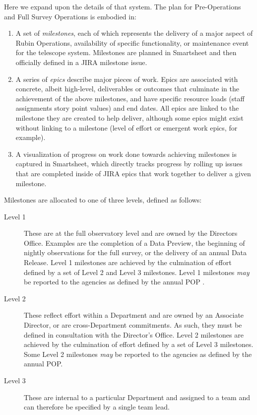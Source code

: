 Here we expand upon the details of that system.
The plan for Pre-Operations and Full Survey \gls{Operations} is embodied in:

\begin{enumerate}
    \item A set of \emph{milestones}, each of which represents the delivery of a major aspect of \gls{Rubin Operations}, availability of specific functionality, or maintenance event for the telescope system.
        Milestones are planned in Smartsheet and then officially defined in a \gls{JIRA} milestone issue.
    \item A series of \emph{epics} describe major pieces of work.
        Epics are associated with concrete, albeit high-level, deliverables or outcomes that culminate in the achievement of the above milestones, and have specific resource loads (staff assignments \gls{story} point values) and end dates.
        All epics are linked to the milestone they are created to help deliver, although some epics might exist without linking to a milestone (level of effort or emergent work epics, for example).
    \item A visualization of progress on work done towards achieving milestones is captured in Smartsheet, which directly tracks progress by rolling up issues that are completed inside of \gls{JIRA} epics that work together to deliver a given milestone.
\end{enumerate}

Milestones are allocated to one of three levels, defined as follows:

\begin{description}
\item[Level 1] These are at the full observatory level and are owned by the Directors Office.
Examples are the completion of a Data Preview, the beginning of nightly observations for the full survey, or the delivery of an annual \gls{Data Release}.
Level 1 milestones are achieved by the culmination of effort defined by a set of Level 2 and Level 3 milestones.
Level 1 milestones {\it may} be reported to the agencies as defined by the annual \gls{POP} .
\item[Level 2] These reflect effort within a Department and are owned by an Associate \gls{Director}, or are cross-Department commitments.
As such, they must be defined in consultation with the \gls{Director}'s Office.
Level 2 milestones are achieved by the culmination of effort defined by a set of Level 3 milestones.
Some Level 2 milestones {\it may} be reported to the agencies as defined by the annual \gls{POP}.
\item[Level 3] These are internal to a particular Department and assigned to a team and can therefore be specified by a single team lead.
\end{description}

